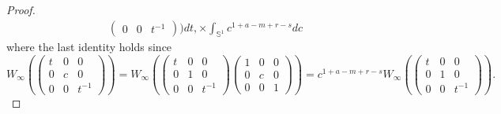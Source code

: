 \documentclass[10pt,a4paper]{amsart}
\begin{document}
\begin{proof}
\begin{align}
\begin{pmatrix}
                                                                                                    0 & 0 & t^{-1} 
                                                                                                  \end{pmatrix}) dt, 
         \times \int_{\mathbb{S}^{1}} c^{1 + a - m + r - s} dc                                                                                                                                                                      
    \end{align}
    where the last identity holds since
    \begin{equation*}
        W_{\infty}(\begin{pmatrix}
                     t & 0 & 0 \\
                     0 & c & 0 \\
                     0 & 0 & t^{-1} 
                    \end{pmatrix}) =  W_{\infty}(\begin{pmatrix}
                                                     t & 0 & 0 \\
                                                     0 & 1 & 0 \\
                                                     0 & 0 & t^{-1} 
                                                  \end{pmatrix} \begin{pmatrix}
                                                                     1 & 0 & 0 \\
                                                                     0 & c & 0 \\
                                                                     0 & 0 & 1
                                                                \end{pmatrix}) = c^{1 + a - m + r - s} W_{\infty}(\begin{pmatrix}
                                                                                                                     t & 0 & 0 \\
                                                                                                                     0 & 1 & 0 \\
                                                                                                                     0 & 0 & t^{-1} 
                                                                                                                    \end{pmatrix}). 

\end{equation*}
\end{proof}
\end{document}
